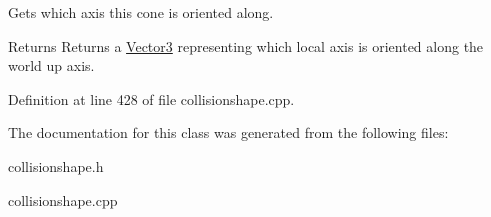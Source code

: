 Gets which axis this cone is oriented along. 

\begin{DoxyReturn}{Returns}
Returns a \hyperlink{classphys_1_1Vector3}{Vector3} representing which local axis is oriented along the world up axis. 
\end{DoxyReturn}


Definition at line 428 of file collisionshape.cpp.



The documentation for this class was generated from the following files:\begin{DoxyCompactItemize}
\item 
collisionshape.h\item 
collisionshape.cpp\end{DoxyCompactItemize}

